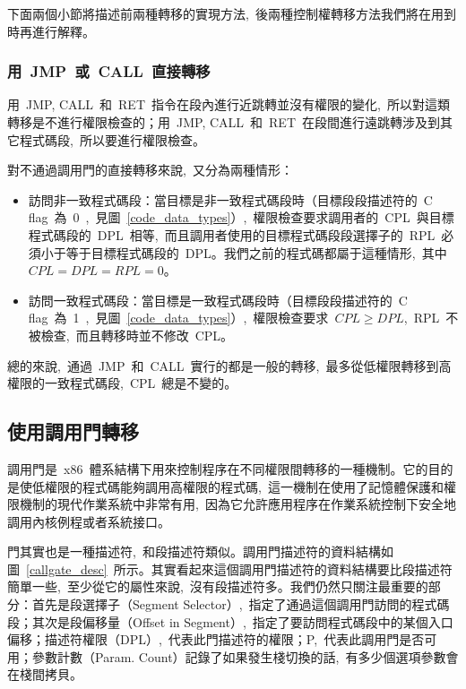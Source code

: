 下面兩個小節將描述前兩種轉移的實現方法,~後兩種控制權轉移方法我們將在用到時再進行解釋。

\subsubsection{用~JMP~或~CALL~直接轉移}

用~JMP, CALL~和~RET~指令在段內進行近跳轉並沒有權限的變化,~所以對這類轉移是不進行權限檢查的；用~JMP, CALL~和~RET~在段間進行遠跳轉涉及到其它程式碼段,~所以要進行權限檢查。

對不通過調用門的直接轉移來說,~又分為兩種情形：

\begin{itemize}
\item{訪問非一致程式碼段}：當目標是非一致程式碼段時（目標段段描述符的~C flag~為~0~,~見圖~\ref{code_data_types}）,~權限檢查要求調用者的~CPL~與目標程式碼段的~DPL~相等,~而且調用者使用的目標程式碼段段選擇子的~RPL~必須小于等于目標程式碼段的~DPL。我們之前的程式碼都屬于這種情形,~其中~$CPL=DPL=RPL=0$。
\item{訪問一致程式碼段}：當目標是一致程式碼段時（目標段段描述符的~C flag~為~1~,~見圖~\ref{code_data_types}）,~權限檢查要求~$CPL \ge DPL$,~RPL~不被檢查,~而且轉移時並不修改~CPL。
\end{itemize}

總的來說,~通過~JMP~和~CALL~實行的都是一般的轉移,~最多從低權限轉移到高權限的一致程式碼段,~CPL~總是不變的。

\subsection{使用調用門轉移}\label{CHpm_callgate}

調用門是~x86~體系結構下用來控制程序在不同權限間轉移的一種機制。它的目的是使低權限的程式碼能夠調用高權限的程式碼,~這一機制在使用了記憶體保護和權限機制的現代作業系統中非常有用,~因為它允許應用程序在作業系統控制下安全地調用內核例程或者系統接口。


門其實也是一種描述符,~和段描述符類似。調用門描述符的資料結構如圖~\ref{callgate_desc}~所示。其實看起來這個調用門描述符的資料結構要比段描述符簡單一些,~至少從它的屬性來說,~沒有段描述符多。我們仍然只關注最重要的部分：首先是段選擇子（Segment Selector）,~指定了通過這個調用門訪問的程式碼段；其次是段偏移量（Offset in Segment）,~指定了要訪問程式碼段中的某個入口偏移；描述符權限（DPL）,~代表此門描述符的權限；P,~代表此調用門是否可用；參數計數（Param. Count）記錄了如果發生棧切換的話,~有多少個選項參數會在棧間拷貝。

